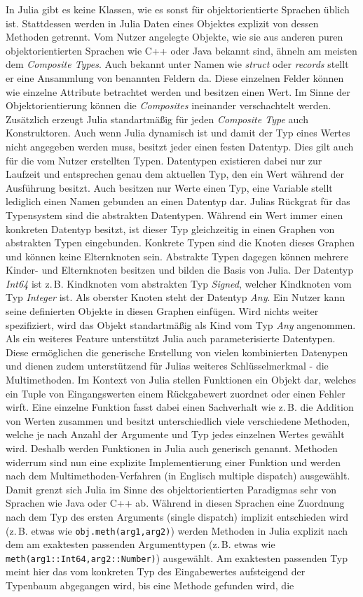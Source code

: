 \documentclass[proseminar,german,utf8]{zihpub}
\newcommand{\zB}[0]{{z.\,B. }}
\begin{document}
In Julia gibt es keine Klassen, wie es sonst für objektorientierte Sprachen üblich ist. Stattdessen werden in Julia Daten eines Objektes explizit von dessen Methoden getrennt. Vom Nutzer angelegte Objekte, wie sie aus anderen puren objektorientierten Sprachen wie C++ oder Java bekannt sind, ähneln am meisten dem \textit{Composite Types}. Auch bekannt unter Namen wie \textit{struct} oder \textit{records} stellt er eine Ansammlung von benannten Feldern da. Diese einzelnen Felder können wie einzelne Attribute betrachtet werden und besitzen einen Wert. Im Sinne der Objektorientierung können die \textit{Composites} ineinander verschachtelt werden. Zusätzlich erzeugt Julia standartmäßig für jeden \textit{Composite Type} auch Konstruktoren. Auch wenn Julia dynamisch ist und damit der Typ eines Wertes nicht angegeben werden muss, besitzt jeder einen festen Datentyp. Dies gilt auch für die vom Nutzer erstellten Typen.  Datentypen existieren dabei nur zur Laufzeit und entsprechen genau dem aktuellen Typ, den ein Wert während der Ausführung besitzt. Auch besitzen nur Werte einen Typ, eine Variable stellt lediglich einen Namen gebunden an einen Datentyp dar. Julias Rückgrat für das Typensystem sind die abstrakten Datentypen. Während ein Wert immer einen konkreten Datentyp besitzt, ist dieser Typ gleichzeitig in einen Graphen von abstrakten Typen eingebunden. Konkrete Typen sind die Knoten dieses Graphen und können keine Elternknoten sein. Abstrakte Typen dagegen können mehrere Kinder- und Elternknoten besitzen und bilden die Basis von Julia. Der Datentyp \textit{Int64} ist \zB Kindknoten vom abstrakten Typ \textit{Signed}, welcher Kindknoten vom Typ \textit{Integer} ist. Als oberster Knoten steht der Datentyp \textit{Any}. Ein Nutzer kann seine definierten Objekte in diesen Graphen einfügen. Wird nichts weiter spezifiziert, wird das Objekt standartmäßig als Kind vom Typ \textit{Any} angenommen. Als ein weiteres Feature unterstützt Julia auch parameterisierte Datentypen. Diese ermöglichen die generische Erstellung von vielen kombinierten Datenypen und dienen zudem unterstützend für Julias weiteres Schlüsselmerkmal - die Multimethoden. Im Kontext von Julia stellen Funktionen ein Objekt dar, welches ein Tuple von Eingangswerten einem Rückgabewert zuordnet oder einen Fehler wirft. Eine einzelne Funktion fasst dabei einen Sachverhalt wie \zB die Addition von Werten zusammen und besitzt unterschiedlich viele verschiedene Methoden, welche je nach Anzahl der Argumente und Typ jedes einzelnen Wertes gewählt wird. Deshalb werden Funktionen in Julia auch generisch genannt. Methoden widerrum sind nun eine explizite Implementierung einer Funktion und werden nach dem Multimethoden-Verfahren (in Englisch multiple dispatch) ausgewählt. Damit grenzt sich Julia im Sinne des objektorientierten Paradigmas sehr von Sprachen wie Java oder C++ ab. Während in diesen Sprachen eine Zuordnung nach dem Typ des ersten Arguments (single dispatch) implizit entschieden wird (\zB etwas wie \verb|obj.meth(arg1,arg2)|) werden Methoden in Julia explizit nach dem am exaktesten passenden Argumenttypen (\zB etwas wie \verb|meth(arg1::Int64,arg2::Number)|) ausgewählt. Am exaktesten passenden Typ meint hier das vom konkreten Typ des Eingabewertes aufsteigend der Typenbaum abgegangen wird, bis eine Methode gefunden wird, die 
\end{document}

